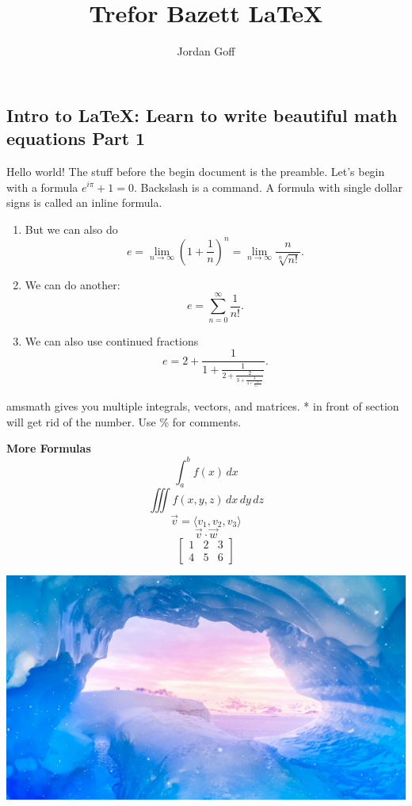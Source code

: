 \documentclass[12pt]{article}
\title{Trefor Bazett \LaTeX}
\author{Jordan Goff}
\date{}
\begin{document}
\maketitle
\newpage

\begin{center}
\section*{Intro to \LaTeX: Learn to write beautiful math equations Part 1}
\end{center}

Hello world! The stuff before the begin document is the preamble. Let's begin with a formula $e^{i\pi}+1=0$. Backslash is a command. A formula with single dollar signs is called an inline formula.

\begin{enumerate} %
\item But we can also do
\[e=\lim_{n\to\infty}\left(1+\frac{1}{n}\right)^{n}=\lim_{n\to\infty}\frac{n}{\sqrt[n]{n!}}.\]

\item We can do another:
\[e=\sum_{n=0}^{\infty}\frac{1}{n!}.\]

\item We can also use continued fractions
\[e=2+\frac{1}{1+\frac{1}{2+\frac{2}{3+\frac{3}{4+\frac{4}{5+\ddots}}}}}.\]
\end{enumerate}

amsmath gives you multiple integrals, vectors, and matrices. * in front of section will get rid of the number. Use \% for comments.
\vspace{15pt}

\noindent\textbf{More Formulas}
\[\int_{a}^{b}f(x)\,dx\]
\[\iiint f(x,y,z)\,dx\,dy\,dz\]
\[\vec{v}=\langle v_1,v_2,v_3\rangle\]
\[\vec{v}\cdot\vec{w}\]
\[
\begin{bmatrix}
1 & 2 & 3\\
4 & 5 & 6
\end{bmatrix}
\]

\begin{center}
\includegraphics[scale=0.1]{Ice.jpg}
\end{center}
\end{document}
